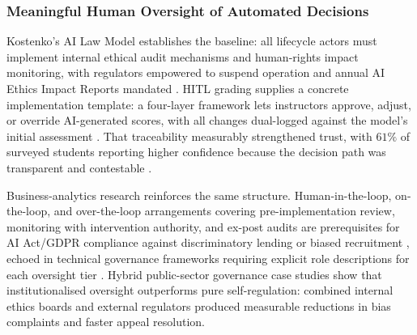 \documentclass[11pt]{article}
\begin{document}
\subsubsection{Meaningful Human Oversight of Automated Decisions}
\label{sec:meaningful_human_oversight} Kostenko's AI Law Model establishes the baseline: all lifecycle actors must implement internal ethical audit mechanisms and human-rights impact monitoring, with regulators empowered to suspend operation and annual AI Ethics Impact Reports mandated \parencites[61--62]{2977039}. HITL grading supplies a concrete implementation template: a four-layer framework lets instructors approve, adjust, or override AI-generated scores, with all changes dual-logged against the model's initial assessment \parencites[16]{6805789}. That traceability measurably strengthened trust, with $61\%$ of surveyed students reporting higher confidence because the decision path was transparent and contestable \parencites[8]{6805789}[20]{6805789}.

Business-analytics research reinforces the same structure. Human-in-the-loop, on-the-loop, and over-the-loop arrangements covering pre-implementation review, monitoring with intervention authority, and ex-post audits are prerequisites for AI Act/GDPR compliance against discriminatory lending or biased recruitment \parencites[7]{7461574}[9]{7461574}, echoed in technical governance frameworks requiring explicit role descriptions for each oversight tier \parencites[5]{6794105}. Hybrid public-sector governance case studies show \parencites[2]{0375818} that institutionalised oversight outperforms pure self-regulation: combined internal ethics boards and external regulators produced measurable reductions in bias complaints and faster appeal resolution.
\end{document}
